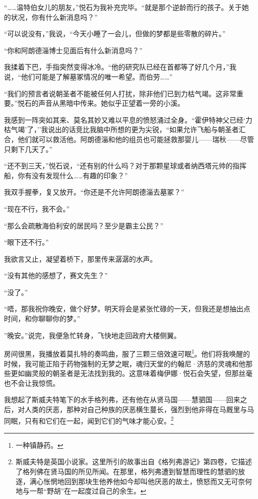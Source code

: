\documentclass[AutoFakeBold=true]{book}
\begin{document}
``……温特伯女儿的朋友，''悦石为我补充完毕。``就是那个逆龄而行的孩子。关于她的状况，你有什么新消息吗？''

``可以说没有，''我说，``今天小睡了一会儿，但做的梦都是些零散的碎片。''

``你和阿朗德淄博士见面后有什么新消息吗？''

我揉着下巴，手指突然变得冰冷。``他的研究队已经在首都等了好几个月，''我说，``他们可能是了解墓冢情况的唯一希望。而伯劳……''

``我们的预言者说朝圣者不能被任何人打扰，除非他们已到力枯气竭。这非常重要。''悦石的声音从黑暗中传来。她似乎正望着一旁的小溪。

我感到一阵突如其来、莫名其妙又难以平息的愤怒涌过全身。``霍伊特神父已经`力枯气竭'了，''我说出的话竞比我脑中所想的更为尖锐，``如果允许飞船与朝圣者汇合，他们就可以救活他。阿朗德淄和他的组员也可能拯救那婴儿——瑞秋——尽管只剩下几天了。''

``还不到三天，''悦石说，``还有别的什么吗？对于那颗星球或者纳西塔元帅的指挥船，你有没有发现什么……有趣的印象？''

我双手握拳，复又放开。``你还是不允许阿朗德淄去墓冢？''

``现在不行，我不会。''

``那么会疏散海伯利安的居民吗？至少是霸主公民？''

``眼下还不行。''

我欲言又止，凝望着桥下，那里传来潺潺的水声。

``没有其他的感想了，赛文先生？''

``没了。''

``唔，那我祝你晚安，做个好梦。明天将会是紧张忙碌的一天，但我还是想抽出点时间，和你聊聊你的梦。''

''晚安。''说完，我便急忙转身，飞快地走回政府大楼侧翼。

房间很黑，我播放着莫扎特的奏鸣曲，服了三颗三倍效速可眠\footnote{一种镇静药。}。他们将我唤醒的时候，我可能正陷于药物强制的无梦之眠，魂归天堂的约翰尼·济慈的灵魂和他那些更如幽灵般的朝圣者是无法找到我的。这意味着梅伊娜·悦石会失望，但那丝毫也不会让我惊慌。

我想起了斯威夫特笔下的水手格列弗，还有他在从贤马国——慧驷国——回来之后，对人类的厌恶，那种对自己种族的厌恶横生蔓长，强烈到他非得在马厩里与马同眠，只有和它们在一起，闻到它们的气味才能心安。\footnote{斯威夫特是英国小说家。这里所引的故事出自《格列弗游记》第四卷，它描述了格列佛在贤马国的所见所闻。在那里，格列弗遭到智慧而理性的慧驷的放逐，满心怅惘地回到那块生他养他如今却叫他厌恶的故土，愤怒而又无可奈何地与一帮``野胡''在一起度过自己的余生。}
\end{document}
